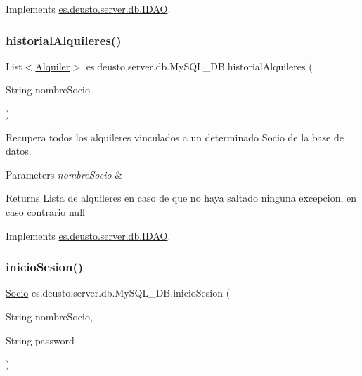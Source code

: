 Implements \mbox{\hyperlink{interfacees_1_1deusto_1_1server_1_1db_1_1_i_d_a_o_a376e9e8f235b13262d5b63541aeb3fd1}{es.\+deusto.\+server.\+db.\+I\+D\+AO}}.

\mbox{\label{classes_1_1deusto_1_1server_1_1db_1_1_my_s_q_l___d_b_a8759ef6481a9fbab8ee3cad5a99abbc9}} 
\subsubsection{\texorpdfstring{historialAlquileres()}{historialAlquileres()}}
{\footnotesize\ttfamily List$<$\mbox{\hyperlink{classes_1_1deusto_1_1client_1_1data_1_1_alquiler}{Alquiler}}$>$ es.\+deusto.\+server.\+db.\+My\+S\+Q\+L\+\_\+\+D\+B.\+historial\+Alquileres (\begin{DoxyParamCaption}\item[{String}]{nombre\+Socio }\end{DoxyParamCaption})}

Recupera todos los alquileres vinculados a un determinado Socio de la base de datos. 
\begin{DoxyParams}{Parameters}
{\em nombre\+Socio} & \\
\hline
\end{DoxyParams}
\begin{DoxyReturn}{Returns}
Lista de alquileres en caso de que no haya saltado ninguna excepcion, en caso contrario null 
\end{DoxyReturn}


Implements \mbox{\hyperlink{interfacees_1_1deusto_1_1server_1_1db_1_1_i_d_a_o_a693bc26b74c79a8e02bcfc4ca472f078}{es.\+deusto.\+server.\+db.\+I\+D\+AO}}.

\mbox{\label{classes_1_1deusto_1_1server_1_1db_1_1_my_s_q_l___d_b_a2af44018d93fc4b14ddbb3e4bdd8bf05}} 
\subsubsection{\texorpdfstring{inicioSesion()}{inicioSesion()}}
{\footnotesize\ttfamily \mbox{\hyperlink{classes_1_1deusto_1_1client_1_1data_1_1_socio}{Socio}} es.\+deusto.\+server.\+db.\+My\+S\+Q\+L\+\_\+\+D\+B.\+inicio\+Sesion (\begin{DoxyParamCaption}\item[{String}]{nombre\+Socio,  }\item[{String}]{password }\end{DoxyParamCaption})}


